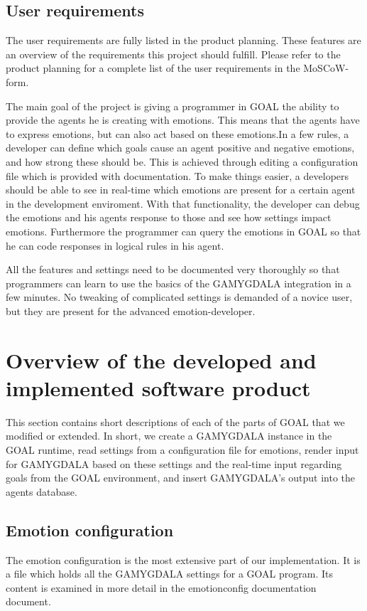 \documentclass[11pt]{article}
\begin{document}
\subsection{User requirements}
The user requirements are fully listed in the product planning. These features are an overview of the requirements this project should fulfill. Please refer to the product planning for a complete list of the user requirements in the \gls{MoSCoW}-form.\cite{MosCoW} \par
The main goal of the project is giving a programmer in GOAL the ability to provide the agents he is creating with emotions. This means that the agents have to express emotions, but can also act based on these emotions.In a few rules, a developer can define which goals cause an agent positive and negative emotions, and how strong these should be. This is achieved through editing a configuration file which is provided with documentation. To make things easier, a developers should be able to see in real-time which emotions are present for a certain agent in the development enviroment. With that functionality, the developer can debug the emotions and his agents response to those and see how settings impact emotions. Furthermore the programmer can query the emotions in GOAL so that he can code responses in logical rules in his agent. \par All the features and settings need to be documented very thoroughly so that programmers can learn to use the basics of the GAMYGDALA integration in a few minutes. No tweaking of complicated settings is demanded of a novice user, but they are present for the advanced emotion-developer.


\section{Overview of the developed and implemented software product}
This section contains short descriptions of each of the parts of GOAL that we modified or extended. In short, we create a GAMYGDALA instance in the GOAL runtime, read settings from a configuration file for emotions, render input for GAMYGDALA based on these settings and the real-time input regarding goals from the GOAL environment, and insert GAMYGDALA's output into the agents database.

\subsection{Emotion configuration}
The emotion configuration is the most extensive part of our implementation. It is a file which holds all the GAMYGDALA settings for a GOAL program. Its content is examined in more detail in the emotionconfig documentation document.
\end{document}
